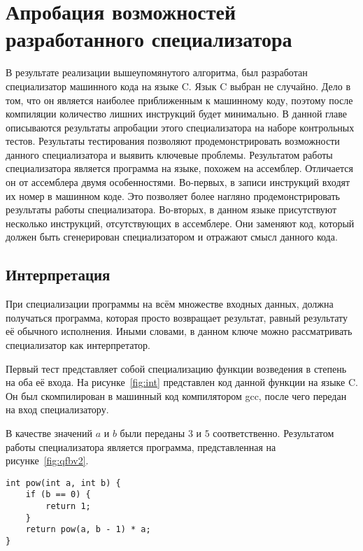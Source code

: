 \section{Апробация возможностей разработанного специализатора}
В результате реализации вышеупомянутого алгоритма, был разработан специализатор машинного кода на языке \textsf{C}. Язык \textsf{C} выбран не случайно. Дело в том, что он является наиболее приближенным к машинному коду, поэтому после компиляции количество лишних инструкций будет минимально. В данной главе описываются результаты апробации этого специализатора на наборе контрольных тестов. Результаты тестирования позволяют продемонстрировать возможности данного специализатора и выявить ключевые проблемы.
Результатом работы специализатора является программа на языке, похожем на ассемблер. Отличается он от ассемблера двумя особенностями. Во-первых, в записи инструкций входят их номер в машинном коде. Это позволяет более нагляно продемонстрировать результаты работы специализатора. Во-вторых, в данном языке присутствуют несколько инструкций, отсутствующих в ассемблере. Они заменяют код, который должен быть сгенерирован специализатором и отражают смысл данного кода.

\subsection{Интерпретация}
При специализации программы на всём множестве входных данных, должна получаться программа, которая просто возвращает результат,
равный результату её обычного исполнения.
Иными словами, в данном ключе можно рассматривать специализатор как интерпретатор.

Первый тест представляет собой специализацию функции возведения в степень на оба её входа. На рисунке~\ref{fig:int} представлен код данной функции на языке \textsf{C}. Он был скомпилирован в машинный код компилятором gcc, после чего передан на вход специализатору.

В качестве значений $a$ и $b$ были переданы $3$ и $5$ соответственно. Результатом работы специализатора является программа, представленная на рисунке~\ref{fig:qfbv2}.

\newsavebox\boxseven
\begin{lrbox}{\boxseven}
\begin{lstlisting}[xleftmargin = 20pt]
int pow(int a, int b) {
    if (b == 0) {
        return 1;
    }
    return pow(a, b - 1) * a;
}
\end{lstlisting}
\end{lrbox}


